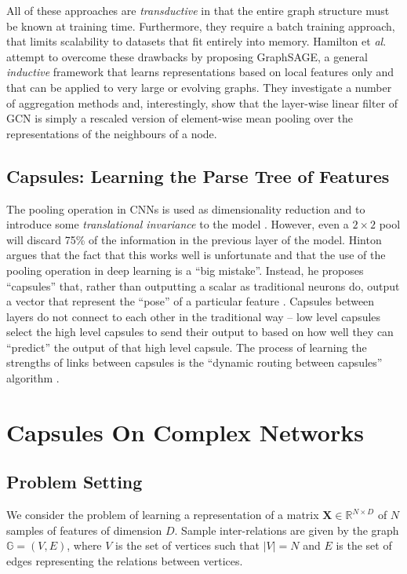 \documentclass{IEEEtran}
\begin{document}
	All of these approaches are \textit{transductive} in that the entire graph structure must be known at training time. Furthermore, they require a batch training approach, that limits scalability to datasets that fit entirely into memory. 
	Hamilton et \textit{al}. \cite{hamilton2017inductive} attempt to overcome these drawbacks by proposing GraphSAGE, a general \textit{inductive} framework that learns representations based on local features only and that can be applied to very large or evolving graphs. 
	They investigate a number of aggregation methods and, interestingly, show that the layer-wise linear filter of GCN is simply a rescaled version of element-wise mean pooling over the representations of the neighbours of a node.
	
	
		
	
	\subsection{Capsules: Learning the Parse Tree of Features}
	The pooling operation in CNNs is used as dimensionality reduction and to introduce some \textit{translational invariance} to the model \cite{krizhevsky2012imagenet}. 
	However, even a $2\times2$ pool will discard 75\% of the information in the previous layer of the model.
	Hinton argues that the fact that this works well is unfortunate and that the use of the pooling operation in deep learning is a ``big mistake''.
	Instead, he proposes ``capsules'' that, rather than outputting a scalar as traditional neurons do, output a vector that represent the ``pose'' of a particular feature \cite{hinton2011transforming}.
	Capsules between layers do not connect to each other in the traditional way -- low level capsules select the high level capsules to send their output to based on how well they can ``predict'' the output of that high level capsule.
	The process of learning the strengths of links between capsules is the ``dynamic routing between capsules'' algorithm \cite{sabour2017dynamic}. 
	
	
	
	\section{Capsules On Complex Networks}
	
	\subsection{Problem Setting}
	We consider the problem of learning a representation of a matrix $\textbf{X} \in \mathbb{R}^{N\times D}$ of $N$ samples of features of dimension $D$. Sample inter-relations are given by the graph $\mathbb{G} = (V, E)$, where $V$ is the set of vertices such that $|V|=N$ and $E$ is the set of edges representing the relations between vertices. 
	
\end{document}
